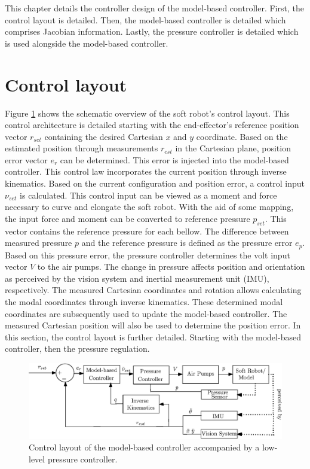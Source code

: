 \label{chap4}

This chapter details the controller design of the model-based controller. First, the control layout is detailed. Then, the model-based controller is detailed which comprises Jacobian information. Lastly, the pressure controller is detailed which is used alongside the model-based controller. 



\section{Control layout}

Figure \ref{fig4:controllayout} shows the schematic overview of the soft robot's control layout. This control architecture is detailed starting with the end-effector's reference position vector $r_{set}$ containing the desired Cartesian $x$ and $y$ coordinate. Based on the estimated position through measurements $r_{est}$ in the Cartesian plane, position error vector $e_r$ can be determined. This error is injected into the model-based controller. This control law incorporates the current position through inverse kinematics. Based on the current configuration and position error, a control input $\nu_{set}$ is calculated. This control input can be viewed as a moment and force necessary to curve and elongate the soft robot. With the aid of some mapping, the input force and moment can be converted to reference pressure $p_{set}$. This vector contains the reference pressure for each bellow. The difference between measured pressure $p$ and the reference pressure is defined as the pressure error $e_p$. Based on this pressure error, the pressure controller determines the volt input vector $V$ to the air pumps. The change in pressure affects position and orientation as perceived by the vision system and inertial measurement unit (IMU), respectively. The measured Cartesian coordinates and rotation allows calculating the modal coordinates through inverse kinematics. These determined modal coordinates are subsequently used to update the model-based controller. The measured Cartesian position will also be used to determine the position error. In this section, the control layout is further detailed. Starting with the model-based controller, then the pressure regulation.


\begin{figure}[H]
    \centering
    \includegraphics[width = \textwidth]{Figures/Chapter4/ControlschemeActualwithPump.eps}
    \caption{Control layout of the model-based controller accompanied by a low-level pressure controller.}
    \label{fig4:controllayout}
\end{figure}




